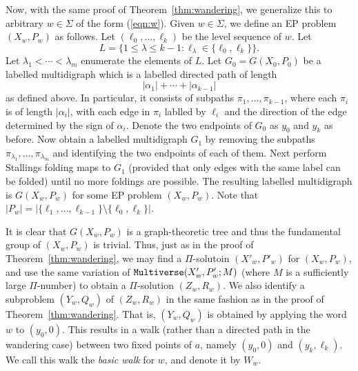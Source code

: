 \documentclass[11pt]{amsart}
\theoremstyle{definition}
\theoremstyle{definition}
\numberwithin{equation}{section}
\begin{document}
Now, with the same proof of Theorem~\ref{thm:wandering}, we generalize this to arbitrary $w\in \Sigma$ of the form (\ref{eqn:w}). Given $w\in\Sigma$, we define an EP problem $(X_w, P_w)$ as follows. Let $(\ell_0, \dots, \ell_k)$ be the level sequence of $w$. Let
$$ L=\big\{1\leq \lambda\leq k-1\colon \ell_\lambda\in \{\ell_0, \ell_k\}\big\}. $$
Let $\lambda_1<\cdots<\lambda_m$ enumerate the elements of $L$. Let $G_0=G(X_0, P_0)$ be a labelled multidigraph which is a labelled directed path of length
$$ |\alpha_1|+\cdots+|\alpha_{k-1}|$$
as defined above. In particular, it consists of subpaths $\pi_1,\dots, \pi_{k-1}$, where each $\pi_i$ is of length $|\alpha_i|$, with each edge in $\pi_i$ lablled by $\ell_i$ and the direction of the edge determined by the sign of $\alpha_i$. Denote the two endpoints of $G_0$ as $y_0$ and $y_k$ as before. Now obtain a labelled multidigraph $G_1$ by removing the subpaths $\pi_{\lambda_1}, \dots, \pi_{\lambda_m}$ and identifying the two endpoints of each of them. Next perform Stallings folding maps to $G_1$ (provided that only edges with the same label can be folded) until no more foldings are possible. The resulting labelled multidigraph is $G(X_w, P_w)$ for some EP problem $(X_w, P_w)$. Note that $|P_w|=|\{\ell_1,\dots, \ell_{k-1}\}\setminus\{\ell_0, \ell_k\}|$.

It is clear that $G(X_w, P_w)$ is a graph-theoretic tree and thus the fundamental group of $(X_w, P_w)$ is trivial. Thus, just as in the proof of Theorem~\ref{thm:wandering}, we may find a $\Pi$-solutoin $(X'_w, P'_w)$ for $(X_w, P_w)$, and use the same variation of ${\tt Multiverse}(X'_w, P'_w; M)$ (where $M$ is a sufficiently large $\Pi$-number) to obtain a $\Pi$-solution $(Z_w, R_w)$. We also identify a subproblem $(Y_w, Q_w)$ of $(Z_w, R_w)$ in the same fashion as in the proof of Theorem~\ref{thm:wandering}. That is, $(Y_w, Q_w)$ is obtained by applying the word $w$ to $(y_0,0)$. This results in a walk (rather than a directed path in the wandering case) between two fixed points of $a$, namely $(y_0,0)$ and $(y_k,\ell_k)$.
We call this walk the {\em basic walk} for $w$, and denote it by $W_w$. 
\end{document}
